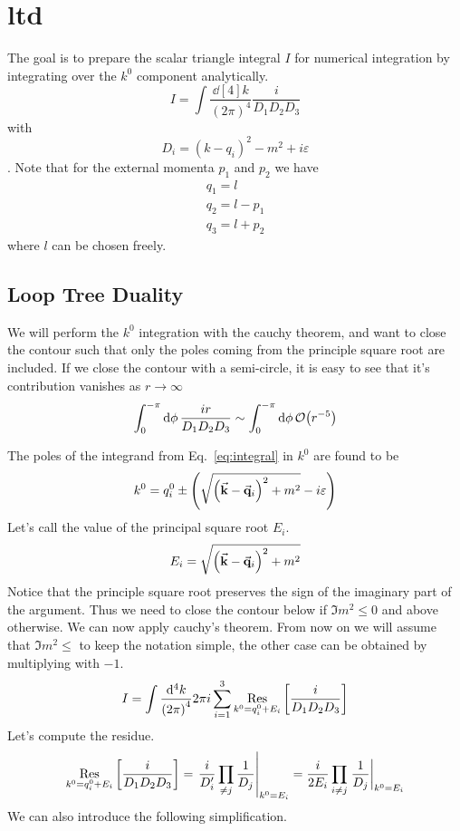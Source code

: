 \section{ltd}

The goal is to prepare the scalar triangle integral $I$ for numerical integration by integrating over the $k^0$ component analytically.
\begin{equation}
    I = \int \frac{\dd[4]{k}}{{(2\pi)}^4} \frac{i}{D_1D_2D_3} \label{eq:integral}
\end{equation}
with
\begin{equation}
    D_i = {(k-q_i)}^2-m^2+i\varepsilon \label{eq:denom}
\end{equation}.
Note that for the external momenta $p_1$ and $p_2$ we have
\begin{align}
    q_1 = l\\
    q_2 = l - p_1\\
    q_3 = l + p_2
\end{align}
where $l$ can be chosen freely.
\subsection{Loop Tree Duality}
We will perform the $k^0$ integration with the cauchy theorem, and want to close the contour such that only the poles coming from the principle square root are included. If we close the contour with a semi-circle, it is easy to see that it's contribution vanishes as $r \to \infty$
\begin{equation}
    \int_{0}^{-\pi} \dd{\phi} \frac{ir}{D_1D_2D_3} \sim \int_{0}^{-\pi} \dd{\phi} \order{r^{-5}}
\end{equation}

The poles of the integrand from Eq.~\eqref{eq:integral} in $k^0$ are found to be
\begin{equation}
    k^0 = q_i^0 \pm \qty(\sqrt{{\qty(\va{k}-\va{q}_i)}^2+m^2}-i\varepsilon)
\end{equation}
Let's call the value of the principal square root $E_i$.
\begin{equation}
    E_i = \sqrt{{\qty(\va{k}-\va{q}_i)}^2 + m^2}
\end{equation}
Notice that the principle square root preserves the sign of the imaginary part of the argument. Thus we need to close the contour below if $\Im{m^2}\leq0$ and above otherwise. We can now apply cauchy's theorem. From now on we will assume that $\Im{m^2}\leq$ to keep the notation simple, the other case can be obtained by multiplying with $-1$.
\begin{equation}
    I = \int \frac{\dd[4]{k}}{{(2\pi)}^4} 2\pi i \sum_{i= 1}^{3} \On{Res}_{k^0 = q^0_i + E_i}\qty[\frac{i}{D_1D_2D_3}] \label{eq:cauchy}
\end{equation}
Let's compute the residue.
\begin{equation}
    \On{Res}_{k^0 = q^0_i + E_i}\qty[\frac{i}{D_1D_2D_3}] = \eval{\frac{i}{D_i'}\prod_{\neq j} \frac{1}{D_j}}_{k^0=E_i}= \frac{i}{2E_i} \prod_{i\neq j} \eval{\frac{1}{D_j}}_{k^0=E_i} \label{eq:residue}
\end{equation}
We can also introduce the following simplification.

